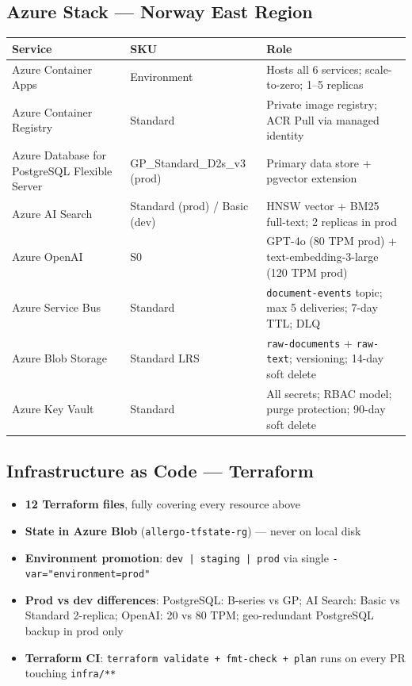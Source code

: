\documentclass[12pt,a4paper]{article}
\newcommand{\codeinline}[1]{\texttt{\small\color{NordicBlue}#1}}
\begin{document}
\subsection{Azure Stack — Norway East Region}

\begin{tabularx}{\textwidth}{llX}
\toprule
\textbf{Service} & \textbf{SKU} & \textbf{Role} \\
\midrule
Azure Container Apps & Environment & Hosts all 6 services; scale-to-zero; 1–5 replicas \\
Azure Container Registry & Standard & Private image registry; ACR Pull via managed identity \\
Azure Database for PostgreSQL Flexible Server & GP\_Standard\_D2s\_v3 (prod) & Primary data store + pgvector extension \\
Azure AI Search & Standard (prod) / Basic (dev) & HNSW vector + BM25 full-text; 2 replicas in prod \\
Azure OpenAI & S0 & GPT-4o (80 TPM prod) + text-embedding-3-large (120 TPM prod) \\
Azure Service Bus & Standard & \codeinline{document-events} topic; max 5 deliveries; 7-day TTL; DLQ \\
Azure Blob Storage & Standard LRS & \codeinline{raw-documents} + \codeinline{raw-text}; versioning; 14-day soft delete \\
Azure Key Vault & Standard & All secrets; RBAC model; purge protection; 90-day soft delete \\
\bottomrule
\end{tabularx}

\subsection{Infrastructure as Code — Terraform}

\begin{itemize}[leftmargin=*]
  \item \textbf{12 Terraform files}, fully covering every resource above
  \item \textbf{State in Azure Blob} (\codeinline{allergo-tfstate-rg}) — never on local disk
  \item \textbf{Environment promotion}: \codeinline{dev | staging | prod} via single \codeinline{-var="environment=prod"}
  \item \textbf{Prod vs dev differences}: PostgreSQL: B-series vs GP; AI Search: Basic vs Standard 2-replica; OpenAI: 20 vs 80 TPM; geo-redundant PostgreSQL backup in prod only
  \item \textbf{Terraform CI}: \codeinline{terraform validate + fmt-check + plan} runs on every PR touching \codeinline{infra/**}
\end{itemize}
\end{document}
